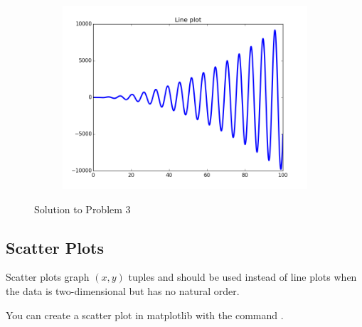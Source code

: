 \begin{figure}
\centering
\begin{subfigure}{.5\textwidth}
\centering
\includegraphics[width=\textwidth]{line_plot.png}
\end{subfigure}
\caption{Solution to Problem 3}
\label{fig:lineplot}
\end{figure}


\subsection*{Scatter Plots} 

Scatter plots graph $(x,y)$ tuples and should be used instead of line plots when the data is two-dimensional but has no natural order. 
 
You can create a scatter plot in matplotlib with the command .

